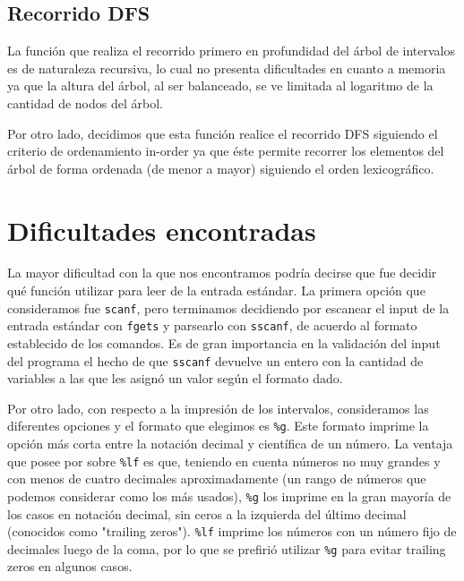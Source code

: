 \documentclass[11pt]{article}
\begin{document}
 \subsection{Recorrido DFS}
 
 La función que realiza el recorrido primero en profundidad del árbol de intervalos es de naturaleza recursiva, lo cual no presenta dificultades en cuanto a memoria ya que la altura del árbol, al ser balanceado, se ve limitada al logaritmo de la cantidad de nodos del árbol. \par

 Por otro lado, decidimos que esta función realice el recorrido DFS siguiendo el criterio de ordenamiento in-order ya que éste permite recorrer los elementos del árbol de forma ordenada (de menor a mayor) siguiendo el orden lexicográfico.\par
 
 \section{Dificultades encontradas}
 
 La mayor dificultad con la que nos encontramos podría decirse que fue decidir qué función utilizar para leer de la entrada estándar. La primera opción que consideramos fue \verb|scanf|, pero terminamos decidiendo por escanear el input de la entrada estándar con \verb|fgets| y parsearlo con \verb|sscanf|, de acuerdo al formato establecido de los comandos. Es de gran importancia en la validación del input del programa el hecho de que \verb|sscanf| devuelve un entero con la cantidad de variables a las que les asignó un valor según el formato dado.\par

 Por otro lado, con respecto a la impresión de los intervalos, consideramos las diferentes opciones y el formato que elegimos es \verb|%g|. Este formato imprime la opción más corta entre la notación decimal y científica de un número.  La ventaja que posee por sobre \verb|%lf| es que, teniendo en cuenta números no muy grandes y con menos de cuatro decimales aproximadamente (un rango de números que podemos considerar como los más usados), \verb|%g| los imprime en la gran mayoría de los casos en notación decimal, sin ceros a la izquierda del último decimal (conocidos como "trailing zeros"). \verb|%lf| imprime los números con un número fijo de decimales luego de la coma, por lo que se prefirió utilizar \verb|%g| para evitar trailing zeros en algunos casos.
\end{document}
